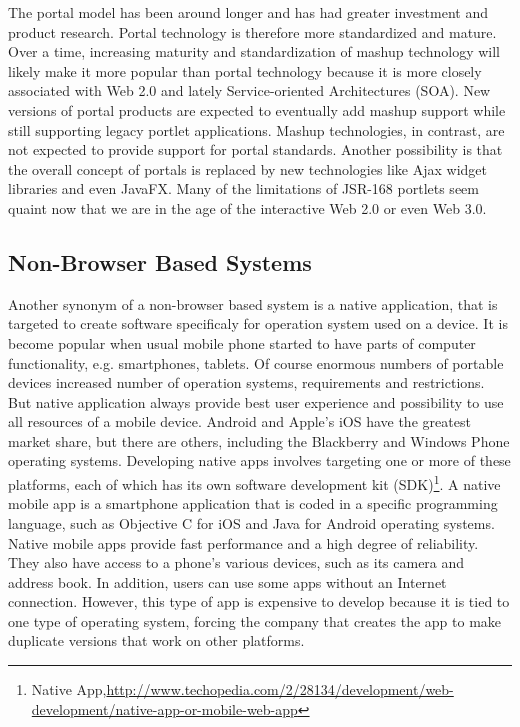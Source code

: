 	The portal model has been around longer and has had greater investment and product research. Portal technology is therefore more standardized and mature. Over a time, increasing maturity and standardization of mashup technology will likely make it more popular than portal technology because it is more closely associated with Web 2.0 and lately Service-oriented Architectures (SOA). New versions of portal products are expected to eventually add mashup support while still supporting legacy portlet applications. Mashup technologies, in contrast, are not expected to provide support for portal standards. Another possibility is that the overall concept of portals is replaced by new technologies like Ajax widget libraries and even JavaFX. Many of the limitations of JSR-168 portlets seem quaint now that we are in the age of the interactive Web 2.0 or even Web 3.0.

\subsection{Non-Browser Based Systems}
	Another synonym of a non-browser based system is a native application, that is targeted to create software specificaly for operation system used on a device. It is become popular when usual mobile phone started to have parts of computer functionality, e.g. smartphones, tablets. Of course enormous numbers of portable devices increased number of operation systems, requirements and restrictions. But native application always provide best user experience and possibility to use all resources of a mobile device. Android and Apple's iOS have the greatest market share, but there are others, including the Blackberry and Windows Phone operating systems. Developing native apps involves targeting one or more of these platforms, each of which has its own software development kit (SDK)\footnote{Native App,\url{http://www.techopedia.com/2/28134/development/web-development/native-app-or-mobile-web-app}}. A native mobile app is a smartphone application that is coded in a specific programming language, such as Objective C for iOS and Java for Android operating systems. Native mobile apps provide fast performance and a high degree of reliability. They also have access to a phone's various devices, such as its camera and address book. In addition, users can use some apps without an Internet connection. However, this type of app is expensive to develop because it is tied to one type of operating system, forcing the company that creates the app to make duplicate versions that work on other platforms.

